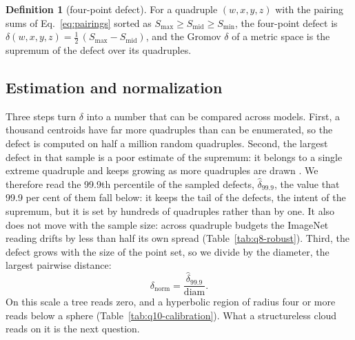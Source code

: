 \documentclass{article}
\theoremstyle{definition}
\newtheorem{definition}{Definition}
\theoremstyle{plain}
\theoremstyle{remark}
\begin{document}
\begin{definition}[four-point defect]
\label{def:defect}
For a quadruple $(w,x,y,z)$ with the pairing sums of Eq.~\ref{eq:pairings} sorted as $S_{\max}\ge S_{\mathrm{mid}}\ge S_{\min}$, the four-point defect is $\delta(w,x,y,z)=\tfrac12\,(S_{\max}-S_{\mathrm{mid}})$, and the Gromov $\delta$ of a metric space is the supremum of the defect over its quadruples.
\end{definition}

\subsection{Estimation and normalization}
\label{sec:v3-estimation}

Three steps turn $\delta$ into a number that can be compared across models. First, a thousand centroids have far more quadruples than can be enumerated, so the defect is computed on half a million random quadruples. Second, the largest defect in that sample is a poor estimate of the supremum: it belongs to a single extreme quadruple and keeps growing as more quadruples are drawn \citep{fournier2015computing}. We therefore read the 99.9th percentile of the sampled defects, $\hat\delta_{99.9}$, the value that 99.9 per cent of them fall below: it keeps the tail of the defects, the intent of the supremum, but it is set by hundreds of quadruples rather than by one. It also does not move with the sample size: across quadruple budgets the ImageNet reading drifts by less than half its own spread (Table~\ref{tab:q8-robust}). Third, the defect grows with the size of the point set, so we divide by the diameter, the largest pairwise distance:
\begin{equation}
\delta_{\text{norm}}=\frac{\hat\delta_{99.9}}{\mathrm{diam}}.
\label{eq:deltanorm}
\end{equation}
On this scale a tree reads zero, and a hyperbolic region of radius four or more reads below a sphere (Table~\ref{tab:q10-calibration}). What a structureless cloud reads on it is the next question.
\end{document}
